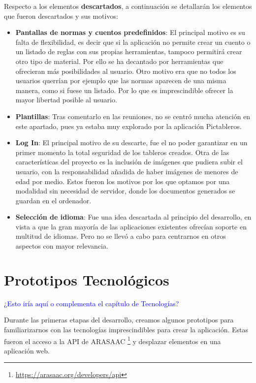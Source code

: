 Respecto a los elementos \textbf{descartados}, a continuación se detallarán los elementos que fueron descartados y sus motivos:

\begin{itemize}
	\item\textbf{Pantallas de normas y cuentos predefinidos}: El principal motivo es su falta de flexibilidad, es decir que si la aplicación no permite crear un cuento o un listado de reglas con sus propias herramientas, tampoco permitirá crear otro tipo de material. Por ello se ha decantado por herramientas que ofrecieran más posibilidades al usuario. Otro motivo era que no todos los usuarios querrían por ejemplo que las normas aparecen de una misma manera, como si fuese un listado. Por lo que es imprescindible ofrecer la mayor libertad posible al usuario.
	
	\item \textbf{Plantillas}: Tras comentarlo en las reuniones, no se centró mucha atención en este apartado, pues ya estaba muy explorado por la aplicación Pictableros.
	
	\item \textbf{Log In}: El principal motivo de su descarte, fue el no poder garantizar en un primer momento la total seguridad de los tableros creados.
	Otra de las características del proyecto es la inclusión de imágenes que pudiera subir el usuario, con la responsabilidad añadida de haber imágenes de menores de edad por medio. Estos fueron los motivos por los que optamos por una modalidad sin necesidad de servidor, donde los documentos generados se guardan en el ordenador.
	
	\item \textbf{Selección de idioma}: Fue una idea descartada al principio del desarrollo, en vista a que la gran mayoría de las aplicaciones existentes ofrecían soporte en multitud de idiomas. Pero no se llevó a cabo para centrarnos en otros aspectos con mayor relevancia.
	
\end{itemize}

\section{Prototipos Tecnológicos}
\textcolor{blue}{¿Esto iría aquí o complementa el capítulo de Tecnologías?}

Durante las primeras etapas del desarrollo, creamos algunos prototipos para familiarizarnos con las tecnologías imprescindibles para crear la aplicación. Estas fueron el acceso a la API de ARASAAC \footnote{\url{https://arasaac.org/developers/api}} y desplazar elementos en una aplicación web.

